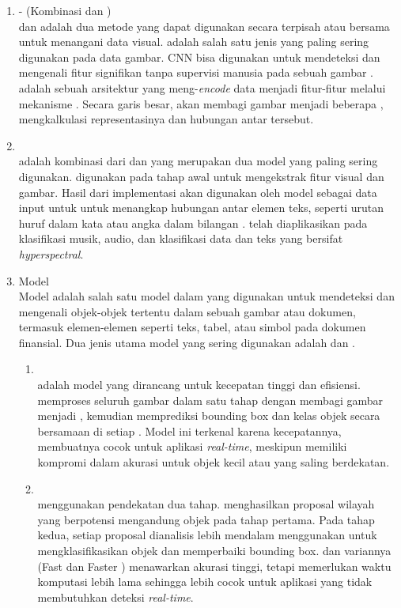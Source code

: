 \begin{enumerate}
	\item \cnn\--\transformer{} (Kombinasi \cnn{} dan \transformer)~\\
	\cnn{} dan \transformer{} adalah dua metode yang dapat digunakan secara terpisah atau bersama untuk menangani data visual. \cnn{} adalah salah satu jenis \MakeLowercase{{\nn{}}} yang paling sering digunakan pada data gambar. CNN bisa digunakan untuk mendeteksi dan mengenali fitur signifikan tanpa supervisi manusia pada sebuah gambar \parencite{alzubaidi2021review}. \transformer{} adalah sebuah arsitektur \MakeLowercase{\nn{}} yang meng-\emph{encode} data menjadi fitur-fitur melalui mekanisme \attention. Secara garis besar, \transformer{} akan membagi gambar menjadi beberapa \patch{}, mengkalkulasi representasinya dan hubungan antar \patch{} tersebut. \parencite{han2021transformer}
	\item \crnnfull~\\
	\crnn{} adalah kombinasi dari \cnn{} dan \rnn{} yang merupakan dua model yang paling sering digunakan. \cnn{} digunakan pada tahap awal untuk mengekstrak fitur visual dan gambar. Hasil dari implementasi \cnn{} akan digunakan oleh model \rnn{} sebagai data input untuk untuk menangkap hubungan antar elemen teks, seperti urutan huruf dalam kata atau angka dalam bilangan \parencite{wang2019convolutional}. \crnn{} telah diaplikasikan pada klasifikasi musik, audio, dan klasifikasi data dan teks yang bersifat \emph{hyperspectral}.  
	\item Model \objectdetection~\\
	Model \objectdetection{} adalah salah satu model dalam \dl{} yang digunakan untuk mendeteksi dan mengenali objek-objek tertentu dalam sebuah gambar atau dokumen, termasuk elemen-elemen seperti teks, tabel, atau simbol pada dokumen finansial. Dua jenis utama model \objectdetection{} yang sering digunakan adalah \yolofull{} dan \rcnnfull{}. 
	\begin{enumerate}
	\item \yolo~\\
	\yolo{} adalah model \objectdetection{} yang dirancang untuk kecepatan tinggi dan efisiensi. \yolo{} memproses seluruh gambar dalam satu tahap dengan membagi gambar menjadi \grid{}, kemudian memprediksi bounding box dan kelas objek secara bersamaan di setiap \grid{} \parencite{diwan2023object}. Model ini terkenal karena kecepatannya, membuatnya cocok untuk aplikasi \emph{real-time}, meskipun memiliki  kompromi dalam akurasi untuk objek kecil atau yang saling berdekatan.
	\item \rcnn~\\
	\rcnn{} menggunakan pendekatan dua tahap. \rcnn{} menghasilkan proposal wilayah yang berpotensi mengandung objek pada tahap pertama. Pada tahap kedua, setiap proposal dianalisis lebih mendalam menggunakan \cnn{} untuk mengklasifikasikan objek dan memperbaiki bounding box. \rcnn{} dan variannya (Fast \rcnn{} dan Faster \rcnn{}) menawarkan akurasi tinggi, tetapi memerlukan waktu komputasi lebih lama sehingga lebih cocok untuk aplikasi yang tidak membutuhkan deteksi \emph{real-time}. \parencite{xie2021oriented}  
	\end{enumerate}
\end{enumerate}